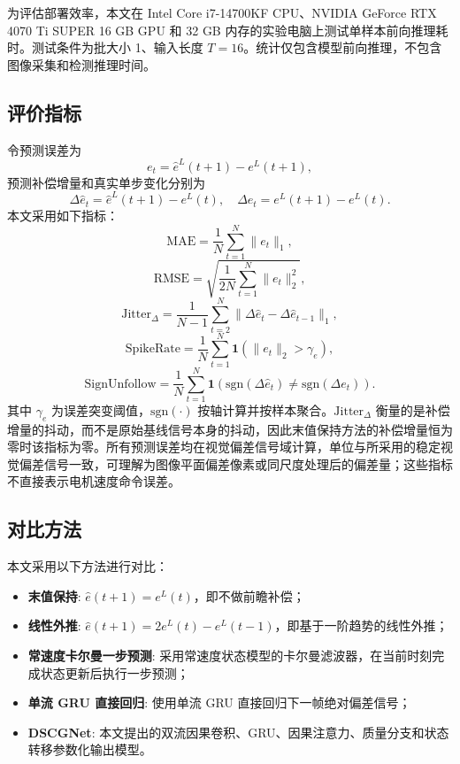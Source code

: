 \documentclass[journal]{IEEEtran}
\newcommand{\legacy}{e^{L}}
\newcommand{\uhat}{\hat{e}^{L}}
\newcommand{\dhat}{\Delta\hat{e}}
\begin{document}
为评估部署效率，本文在 Intel Core i7-14700KF CPU、NVIDIA GeForce RTX 4070 Ti SUPER 16 GB GPU 和 32 GB 内存的实验电脑上测试单样本前向推理耗时。测试条件为批大小 1、输入长度 $T=16$。统计仅包含模型前向推理，不包含图像采集和检测推理时间。

\subsection{评价指标}
令预测误差为
\begin{equation}
e_t=\uhat(t+1)-\legacy(t+1),
\end{equation}
预测补偿增量和真实单步变化分别为
\begin{equation}
\dhat_t=\uhat(t+1)-\legacy(t),\quad \Delta e_t=\legacy(t+1)-\legacy(t).
\end{equation}
本文采用如下指标：
\begin{equation}
\mathrm{MAE}=\frac{1}{N}\sum_{t=1}^{N}\|e_t\|_1,
\end{equation}
\begin{equation}
\mathrm{RMSE}=\sqrt{\frac{1}{2N}\sum_{t=1}^{N}\|e_t\|_2^2},
\end{equation}
\begin{equation}
\mathrm{Jitter}_{\Delta}=\frac{1}{N-1}\sum_{t=2}^{N}\|\dhat_t-\dhat_{t-1}\|_1,
\end{equation}
\begin{equation}
\mathrm{SpikeRate}=\frac{1}{N}\sum_{t=1}^{N}\mathbf{1}(\|e_t\|_2>\gamma_e),
\end{equation}
\begin{equation}
\mathrm{SignUnfollow}=\frac{1}{N}\sum_{t=1}^{N}\mathbf{1}\left(\mathrm{sgn}(\dhat_t)\neq \mathrm{sgn}(\Delta e_t)\right).
\end{equation}
其中 $\gamma_e$ 为误差突变阈值，$\mathrm{sgn}(\cdot)$ 按轴计算并按样本聚合。$\mathrm{Jitter}_{\Delta}$ 衡量的是补偿增量的抖动，而不是原始基线信号本身的抖动，因此末值保持方法的补偿增量恒为零时该指标为零。所有预测误差均在视觉偏差信号域计算，单位与所采用的稳定视觉偏差信号一致，可理解为图像平面偏差像素或同尺度处理后的偏差量；这些指标不直接表示电机速度命令误差。

\subsection{对比方法}
本文采用以下方法进行对比：
\begin{itemize}
    \item \textbf{末值保持}: $\hat{e}(t+1)=\legacy(t)$，即不做前瞻补偿；
    \item \textbf{线性外推}: $\hat{e}(t+1)=2\legacy(t)-\legacy(t-1)$，即基于一阶趋势的线性外推；
    \item \textbf{常速度卡尔曼一步预测}: 采用常速度状态模型的卡尔曼滤波器，在当前时刻完成状态更新后执行一步预测；
    \item \textbf{单流 GRU 直接回归}: 使用单流 GRU 直接回归下一帧绝对偏差信号；
    \item \textbf{DSCGNet}: 本文提出的双流因果卷积、GRU、因果注意力、质量分支和状态转移参数化输出模型。
\end{itemize}
\end{document}
